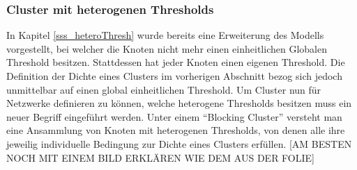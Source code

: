 \documentclass[12pt]{article}
\begin{document}
\subsubsection{Cluster mit heterogenen Thresholds}
In Kapitel \ref{sss_heteroThresh} wurde bereits eine Erweiterung des Modells vorgestellt, bei welcher die Knoten nicht mehr einen einheitlichen Globalen Threshold besitzen. Stattdessen hat jeder Knoten einen eigenen Threshold. Die Definition der Dichte eines Clusters im vorherigen Abschnitt bezog sich jedoch unmittelbar auf einen global einheitlichen Threshold. Um Cluster nun für Netzwerke definieren zu können, welche heterogene Thresholds besitzen muss ein neuer Begriff eingeführt werden. Unter einem "`Blocking Cluster"' versteht man eine Ansammlung von Knoten mit heterogenen Thresholds, von denen alle ihre jeweilig individuelle Bedingung zur Dichte eines Clusters erfüllen. [AM BESTEN NOCH MIT EINEM BILD ERKLÄREN WIE DEM AUS DER FOLIE]
 
\end{document}
